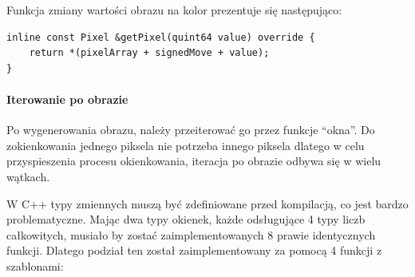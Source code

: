 \par
Funkcja zmiany wartości obrazu na kolor prezentuje się następująco:
\begin{lstlisting}
inline const Pixel &getPixel(quint64 value) override {
    return *(pixelArray + signedMove + value);
}
\end{lstlisting}

\paragraph{Iterowanie po obrazie}
\par
Po wygenerowania obrazu, należy przeiterować go przez funkcje \enquote{okna}.
Do zokienkowania jednego piksela nie potrzeba innego piksela dlatego w celu przyspieszenia procesu okienkowania, iteracja po obrazie odbywa się w wielu wątkach.
\par
W C++ typy zmiennych muszą być zdefiniowane przed kompilacją, co jest bardzo problematyczne.
Mając dwa typy okienek, każde odsługujące 4 typy liczb całkowitych, musiało by zostać zaimplementowanych 8 prawie identycznych funkcji.
Dlatego podział ten został zaimplementowany za pomocą 4 funkcji z szablonami:
